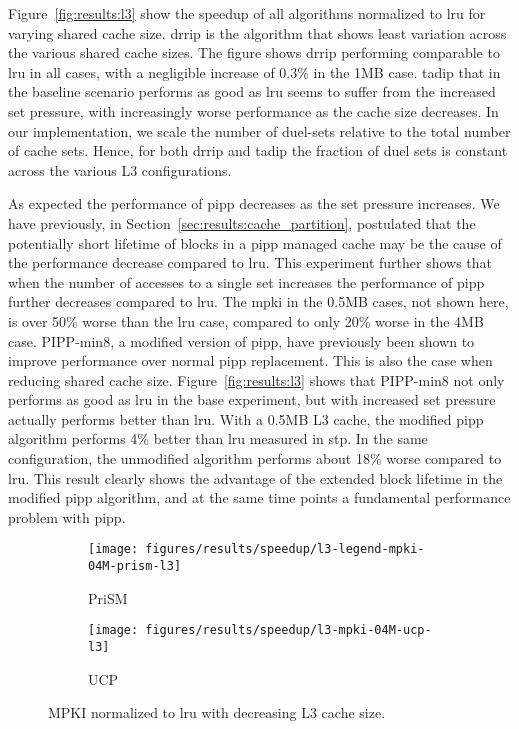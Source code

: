 Figure~\ref{fig:results:l3} show the speedup of all algorithms normalized to \gls{lru} for varying shared cache size.
\gls{drrip} is the algorithm that shows least variation across the various shared cache sizes.
The figure shows \gls{drrip} performing comparable to \gls{lru} in all cases, with a negligible increase of 0.3\% in the 1MB case.
\gls{tadip} that in the baseline scenario performs as good as \gls{lru} seems to suffer from the increased set pressure, with increasingly worse performance as the cache size decreases.
In our implementation, we scale the number of duel-sets relative to the total number of cache sets.
Hence, for both \gls{drrip} and \gls{tadip} the fraction of duel sets is constant across the various L3 configurations.

As expected the performance of \gls{pipp} decreases as the set pressure increases.
We have previously, in Section~\ref{sec:results:cache_partition}, postulated that the potentially short lifetime of blocks in a \gls{pipp} managed cache may be the cause of the performance decrease compared to \gls{lru}.
This experiment further shows that when the number of accesses to a single set increases the performance of \gls{pipp} further decreases compared to \gls{lru}.
The \gls{mpki} in the 0.5MB cases, not shown here, is over 50\% worse than the \gls{lru} case, compared to only 20\% worse in the 4MB case.
PIPP-min8, a modified version of \gls{pipp}, have previously been shown to improve performance over normal \gls{pipp} replacement.
This is also the case when reducing shared cache size.
Figure~\ref{fig:results:l3} shows that PIPP-min8 not only performs as good as \gls{lru} in the base experiment, but with increased set pressure actually performs better than \gls{lru}.
With a 0.5MB L3 cache, the modified \gls{pipp} algorithm performs 4\% better than \gls{lru} measured in \gls{stp}.
In the same configuration, the unmodified algorithm performs about 18\% worse compared to \gls{lru}.
This result clearly shows the advantage of the extended block lifetime in the modified \gls{pipp} algorithm, and at the same time points a fundamental performance problem with \gls{pipp}.


\begin{figure}[t]
    \centering
    \begin{subfigure}[b]{0.5\textwidth}
        \centering
        \texttt{[image: figures/results/speedup/l3-legend-mpki-04M-prism-l3]}
        \caption{PriSM}
        \label{fig:results:l3:mpki-prism}
    \end{subfigure}%
    \begin{subfigure}[b]{0.5\textwidth}
        \centering
        \texttt{[image: figures/results/speedup/l3-mpki-04M-ucp-l3]}
        \caption{UCP}
        \label{fig:results:l3:mpki-ucp}
    \end{subfigure}
    \label{fig:results:l3:mpki}
    \caption{MPKI normalized to \gls{lru} with decreasing L3 cache size.}
\end{figure}

